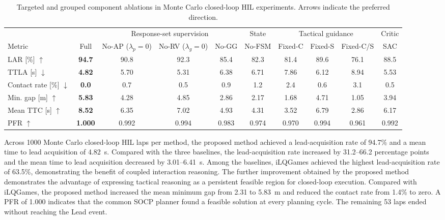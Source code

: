 \documentclass[journal,twoside,web]{ieeecolor}
\begin{document}
\begin{table}[!t]
\centering
\scriptsize
\setlength{\tabcolsep}{2.4pt}
\renewcommand{\arraystretch}{1.10}
\caption{Targeted and grouped component ablations in Monte Carlo closed-loop
HIL experiments. Arrows indicate the preferred direction.}
\label{tab:ablation}
\begin{tabular}{@{}lccccccccc@{}}
\toprule
& & \multicolumn{3}{c}{Response-set supervision}
& \multicolumn{1}{c}{State}
& \multicolumn{3}{c}{Tactical guidance}
& \multicolumn{1}{c}{Critic} \\
\cmidrule(lr){3-5}
\cmidrule(lr){6-6}
\cmidrule(lr){7-9}
\cmidrule(l){10-10}
Metric
& Full
& \shortstack{No-AP\\($\lambda_p=0$)}
& \shortstack{No-RV\\($\lambda_g=0$)}
& No-GG
& No-FSM
& Fixed-C
& Fixed-S
& Fixed-C/S
& SAC \\
\midrule
LAR [\%] $\uparrow$
& \textbf{94.7} & 90.8 & 92.3 & 85.4 & 82.3 & 81.4 & 89.6 & 76.1 & 88.5 \\
TTLA [s] $\downarrow$
& \textbf{4.82} & 5.70 & 5.31 & 6.38 & 6.71 & 7.86 & 6.12 & 8.94 & 5.53 \\
Contact rate [\%] $\downarrow$
& \textbf{0.0} & 0.7 & 0.5 & 0.9 & 1.2 & 2.4 & 0.6 & 3.1 & 0.5 \\
Min. gap [m] $\uparrow$
& \textbf{5.83} & 4.28 & 4.85 & 2.86 & 2.17 & 1.68 & 4.71 & 1.05 & 3.94 \\
Mean TTC [s] $\uparrow$
& \textbf{8.52} & 6.35 & 7.02 & 4.93 & 4.31 & 3.52 & 6.79 & 2.86 & 6.17 \\
PFR $\uparrow$
& \textbf{1.000} & 0.992 & 0.994 & 0.983 & 0.974 & 0.970 & 0.994 & 0.961 & 0.992 \\
\bottomrule
\end{tabular}
\end{table}

Across 1000 Monte Carlo closed-loop HIL laps per method, the proposed method
achieved a lead-acquisition rate of 94.7\% and a mean time to lead acquisition of
4.82~s. Compared with the three baselines, the lead-acquisition rate increased by
31.2--66.2 percentage points and the mean time to lead acquisition decreased by
3.01--6.41~s. Among the baselines, iLQGames achieved the highest lead-acquisition rate
of 63.5\%, demonstrating the benefit of coupled interaction reasoning. The
further improvement obtained by the proposed method demonstrates the advantage
of expressing tactical reasoning as a persistent feasible region for
closed-loop execution. Compared with iLQGames, the proposed method increased
the mean minimum gap from 2.31 to 5.83~m and reduced the contact rate from
1.4\% to zero. A PFR of 1.000 indicates that the common SOCP planner found a
feasible solution at every planning cycle. The remaining 53 laps ended without
reaching the Lead event.
\end{document}
